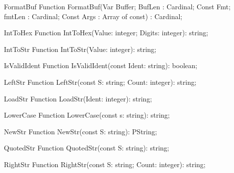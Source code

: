  
\begin{function}{FormatBuf}
\Declaration
Function FormatBuf(Var Buffer; BufLen : Cardinal; Const Fmt; fmtLen : Cardinal; Const Args : Array of const) : Cardinal;
\Description
\Errors
\SeeAlso
\end{function}

 
\begin{function}{IntToHex}
\Declaration
Function IntToHex(Value: integer; Digits: integer): string;
\Description
\Errors
\SeeAlso
\end{function}

 
\begin{function}{IntToStr}
\Declaration
Function IntToStr(Value: integer): string;
\Description
\Errors
\SeeAlso
\end{function}

 
\begin{function}{IsValidIdent}
\Declaration
Function IsValidIdent(const Ident: string): boolean;
\Description
\Errors
\SeeAlso
\end{function}

 
\begin{function}{LeftStr}
\Declaration
Function LeftStr(const S: string; Count: integer): string;
\Description
\Errors
\SeeAlso
\end{function}

 
\begin{function}{LoadStr}
\Declaration
Function LoadStr(Ident: integer): string;
\Description
\Errors
\SeeAlso
\end{function}

 
\begin{function}{LowerCase}
\Declaration
Function LowerCase(const s: string): string;
\Description
\Errors
\SeeAlso
\end{function}

 
\begin{function}{NewStr}
\Declaration
Function NewStr(const S: string): PString;
\Description
\Errors
\SeeAlso
\end{function}

 
\begin{function}{QuotedStr}
\Declaration
Function QuotedStr(const S: string): string;
\Description
\Errors
\SeeAlso
\end{function}

 
\begin{function}{RightStr}
\Declaration
Function RightStr(const S: string; Count: integer): string;
\Description
\Errors
\SeeAlso
\end{function}

